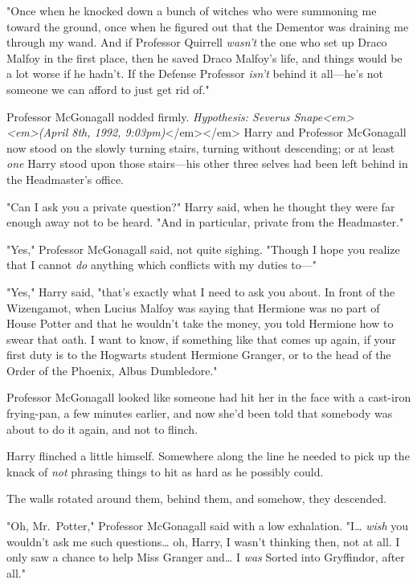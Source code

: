 "Once when he knocked down a bunch of witches who were summoning me toward the ground, once when he figured out that the Dementor was draining me through my wand. And if Professor Quirrell \emph{wasn't} the one who set up Draco Malfoy in the first place, then he saved Draco Malfoy's life, and things would be a lot worse if he hadn't. If the Defense Professor \emph{isn't} behind it all---he's not someone we can afford to just get rid of."

Professor McGonagall nodded firmly.
\sbreak
\emph{Hypothesis: Severus Snape<em>\\
<em>(April 8th, 1992, 9:03pm)}</em></em>
\sbreak
Harry and Professor McGonagall now stood on the slowly turning stairs, turning without descending; or at least \emph{one} Harry stood upon those stairs---his other three selves had been left behind in the Headmaster's office.

"Can I ask you a private question?" Harry said, when he thought they were far enough away not to be heard. "And in particular, private from the Headmaster."

"Yes," Professor McGonagall said, not quite sighing. "Though I hope you realize that I cannot \emph{do} anything which conflicts with my duties to---"

"Yes," Harry said, "that's exactly what I need to ask you about. In front of the Wizengamot, when Lucius Malfoy was saying that Hermione was no part of House Potter and that he wouldn't take the money, you told Hermione how to swear that oath. I want to know, if something like that comes up again, if your first duty is to the Hogwarts student Hermione Granger, or to the head of the Order of the Phoenix, Albus Dumbledore."

Professor McGonagall looked like someone had hit her in the face with a cast-iron frying-pan, a few minutes earlier, and now she'd been told that somebody was about to do it again, and not to flinch.

Harry flinched a little himself. Somewhere along the line he needed to pick up the knack of \emph{not} phrasing things to hit as hard as he possibly could.

The walls rotated around them, behind them, and somehow, they descended.

"Oh, Mr.~Potter," Professor McGonagall said with a low exhalation. "I{\ldots} \emph{wish} you wouldn't ask me such questions{\ldots} oh, Harry, I wasn't thinking then, not at all. I only saw a chance to help Miss Granger and{\ldots} I \emph{was} Sorted into Gryffindor, after all."

